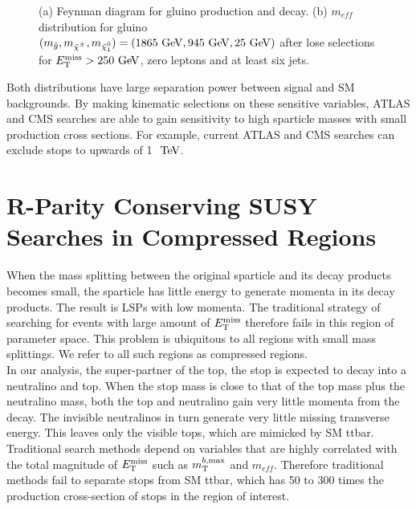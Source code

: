 \begin{figure}[htb]
\begin{center}
\begin{subfigure}[b]{0.45\textwidth}
                \caption{ }
    \end{subfigure}
\caption{ (a) Feynman diagram for gluino production and decay. (b) $m_{eff}$ distribution for gluino $(m_{\gluino}, m_{\chinopm}, m_{\ninoone}) = (1865 \gev, 945 \gev, 25 \gev)$ after lose selections for $\met>250 \gev$, zero leptons and at least six jets.\cite{SUSYinclusive0L} }
\end{center}
\label{fig:gluino_meff} 
\end{figure}

\indent Both distributions have large separation power between signal and SM backgrounds.  By making kinematic selections on these sensitive variables, ATLAS and CMS searches are able to gain sensitivity to high sparticle masses with small production cross sections.  For example, current ATLAS and CMS searches can exclude stops to upwards of 1 $\tev$. \\


\section{R-Parity Conserving SUSY Searches in Compressed Regions}


\indent When the mass splitting between the original sparticle and its decay products becomes small, the sparticle has little energy to generate momenta in its decay products.  The result is LSPs with low momenta.  The traditional strategy of searching for events with large amount of $E_{\mathrm{T}}^{\mathrm{miss}}$ therefore fails in this region of parameter space.  This problem is ubiquitous to all regions with small mass splittings.  We refer to all such regions as compressed regions.  ~\\

\indent  In our analysis, the super-partner of the top, the stop is expected to decay into a neutralino and top.  When the stop mass is close to that of the top mass plus the neutralino mass, both the top and neutralino gain very little momenta from the decay.  The invisible neutralinos in turn generate very little missing transverse energy.  This leaves only the visible tops, which are mimicked by SM ttbar. \\

\indent Traditional search methods depend on variables that are highly correlated with the total magnitude of $E_{\mathrm{T}}^{\mathrm{miss}}$ such as $m_{\mathrm{T}}^{b,\mathrm{max}}$ and $m_{eff}$.  Therefore traditional methods fail to separate stops from SM ttbar, which has 50 to 300 times the production cross-section of stops in the region of interest.  \\ %

